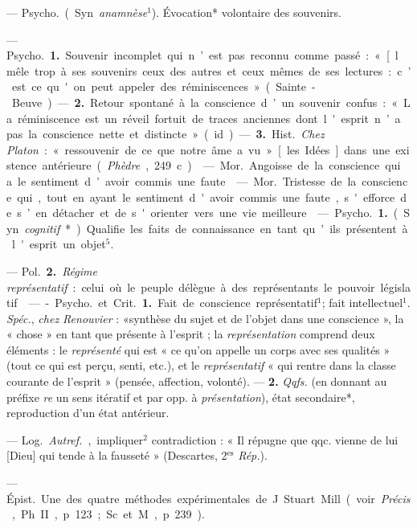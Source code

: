 \begin{itemize}[leftmargin=1cm, label=, itemsep=1pt]
 — \si{Psycho.} (Syn. {\it anamnèse}$^1$). Évocation*
volontaire des souvenirs.

 — \si{Psycho.} {\bf 1.} Souvenir incomplet qui n’est pas
reconnu comme passé : « [l mêle trop à ses souvenirs ceux des autres et ceux
mêmes de ses lectures : c’est ce qu'on peut appeler des réminiscences
» (Sainte-Beuve). — {\bf 2.} Retour spontané à la conscience d’un souvenir
confus : « La réminiscence est un réveil fortuit de traces anciennes dont
l'esprit n’a pas la conscience nette et distincte » (id.).

— {\bf 3.} \si{Hist.} {\it Chez Platon} : « ressouvenir de ce que notre âme a
vu » [les Idées] dans une existence antérieure ({\it Phèdre}, 249 c).

 — \si{Mor.} Angoisse de la conscience qui a le sentiment d’avoir
commis une faute.

 — \si{Mor.} Tristesse de la conscience qui, tout en ayant le
sentiment d'avoir commis une faute, s'efforce de s’en détacher et de
s'orienter vers une vie meilleure.

 — \si{Psycho.} {\bf 1.} (Syn. {\it cognitif}*). Qualifie
les faits de connaissance en tant qu’ils présentent à l'esprit un objet$^5$.

— \si{Pol.} {\bf 2.} {\it Régime représentatif} : celui où le peuple délègue
à des représentants le pouvoir législatif.

 —- \si{Psycho.} et \si{Crit.} {\bf 1.} Fait de conscience
représentatif$^1$; fait intellectuel$^1$. {\it Spéc.}, {\it chez Renouvier} :
«synthèse du sujet et de l’objet dans une conscience », la « chose » en tant
que présente à l'esprit ; la {\it représentation} comprend deux éléments : le
{\it représenté} qui est « ce qu’on appelle un corps avec ses qualités
» (tout ce qui est perçu, senti, etc.), et le {\it représentatif} « qui
rentre dans la classe courante de l'esprit » (pensée, affection, volonté). —
{\bf 2.} {\it Qqfs.} (en donnant au préfixe {\it re} un sens itératif et par
opp. à {\it présentation}), état secondaire*, reproduction d’un état
antérieur.

 — \si{Log.} {\it Autref.}, impliquer$^2$ contradiction : « Il
répugne que qqc. vienne de lui [Dieu] qui tende à la fausseté » (Descartes,
2$^\text{es}$ {\it Rép.}).

 — \si{Épist.} Une des quatre méthodes
expérimentales de J. Stuart Mill (voir {\it Précis}, Ph. II, p. 123; Sc. et
M., p. 239).


\end{itemize}
